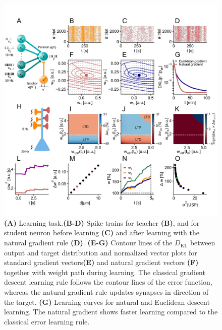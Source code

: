 \documentclass[twocolumn,12pt]{article}
\newcommand{\DKL}{D_\mrm{KL}}
\newcommand{\mrm}{\mathrm}
\begin{document}
 \begin{figure}
\center
\includegraphics[width= .9\textwidth]{Figure_Cosyne2}
\caption{{\bf (A)} Learning task.{\bf(B-D)} Spike trains for teacher {\bf(B)}, and for student neuron before learning {\bf(C)} and after learning with the natural gradient rule {\bf(D)}. {\bf{(E-G)}} Contour lines of the $\DKL$ between output and target distribution and normalized vector plots for standard gradient vectors{\bf(E)} and natural gradient vectors {\bf(F)} together with weight path during learning. The classical gradient descent learning rule follows the contour lines of the error function, whereas the natural gradient rule updates synapses in direction of the target.%
{\bf(G)} Learning curves for natural and Euclidean descent learning. The natural gradient shows faster learning compared to the classical error learning rule. %
}
\end{figure}
\end{document}
